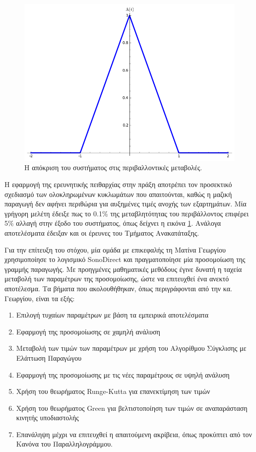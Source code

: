 \documentclass[12pt,a4paper]{extarticle}
\begin{document}
\begin{figure}
\centering
\includegraphics[width=0.7\linewidth]{tmp_emlQZS}
\caption[Αποτελέσματα μετρήσεων]{Η απόκριση του συστήματος στις περιβαλλοντικές μεταβολές.}
\label{fig:tmp_emlQZS}
\end{figure}

Η εφαρμογή της ερευνητικής πειθαρχίας στην πράξη αποτρέπει τον προσεκτικό σχεδιασμό των ολοκληρωμένων κυκλωμάτων που απαιτούνται, καθώς η μαζική παραγωγή δεν
αφήνει περιθώρια για αυξημένες τιμές ανοχής των εξαρτημάτων. Μία γρήγορη μελέτη έδειξε πως το 0.1\% της μεταβλητότητας του περιβάλλοντος επιφέρει 5\% αλλαγή
στην έξοδο του συστήματος, όπως δείχνει η εικόνα \ref{fig:tmp_emlQZS}. Ανάλογα αποτελέσματα έδειξαν και οι έρευνες του Τμήματος Ανακατάταξης.

Για την επίτευξη του στόχου, μία ομάδα με επικεφαλής τη Ματίνα Γεωργίου χρησιμοποίησε το λογισμικό SonoDirect και πραγματοποίησε μία προσομοίωση της γραμμής παραγωγής.
Με προηγμένες μαθηματικές μεθόδους έγινε δυνατή η ταχεία μεταβολή των παραμέτρων της προσομοίωσης, ώστε να επιτευχθεί ένα ανεκτό αποτέλεσμα. Τα βήματα που
ακολουθήθηκαν, όπως περιγράφονται από την κα. Γεωργίου, είναι τα εξής:

\renewcommand{\theenumi}{\alph{enumi}}%
\begin{enumerate}
	\item Επιλογή τυχαίων παραμέτρων με βάση τα εμπειρικά αποτελέσματα
	\item Εφαρμογή της προσομοίωσης σε χαμηλή ανάλυση
	\item Μεταβολή των τιμών των παραμέτρων με χρήση του Αλγορίθμου Σύγκλισης με Ελάττωση Παραγώγου
	\item Εφαρμογή της προσομοίωσης με τις νέες παραμέτρους σε υψηλή ανάλυση
	\item Χρήση του θεωρήματος Runge-Kutta για επανεκτίμηση των τιμών
	\item Χρήση του θεωρήματος Green για βελτιστοποίηση των τιμών σε αναπαράσταση κινητής υποδιαστολής
	\item Επανάληψη μέχρι να επιτευχθεί η απαιτούμενη ακρίβεια, όπως προκύπτει από τον Κανόνα του Παραλληλογράμμου.
\end{enumerate}
\end{document}

